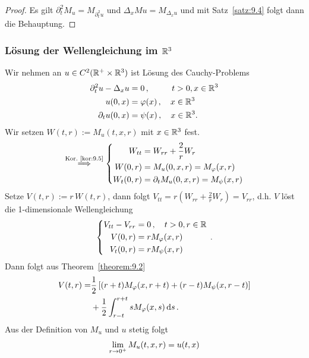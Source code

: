 \begin{proof}
Es gilt $\partial_t^2 M_u = M_{\partial^2_tu}$ und $\Delta_x Mu = M_{\Delta_x u}$ und mit Satz~\ref{satz:9.4} folgt dann die Behauptung.
\end{proof}

\subsubsection{Lösung der Wellengleichung im $\mathbb{R}^3$}

Wir nehmen an $u \in C^2(\mathbb{R}^+ \times \mathbb{R}^3)$ ist Lösung des Cauchy-Problems
\begin{align*}
	\partial^2_t u - \Delta_x u &= 0 \, , \quad \qquad \! \! t >0, x \in \mathbb{R}^3 \\
	u(0,x) & = \varphi (x) \, , \quad x \in \mathbb{R}^3 \\
	\partial_t u(0,x)& = \psi(x) \, , \quad x \in \mathbb{R}^3 .
\end{align*}
Wir setzen $W(t,r) := M_u (t,x,r)$ mit $x \in \mathbb{R}^3$ fest.
\[
	\stackrel{\scriptsize\text{Kor.}~\ref{kor:9.5}}{\Longrightarrow} \left\{
	\begin{aligned}
		W_{tt}&= W_{rr} + \frac 2 r W_r \\
		W(0,r) & = M_u(0,x,r) = M_\varphi (x,r) \\
		W_t (0,r) & = \partial_t M_u (0,x,r) = M_\psi (x,r)
	\end{aligned}
	\right.
\]
Setze $V(t,r) := r \, W(t,r)$, dann folgt $V_{tt} = r(W_{rr} + \frac 2 r W_r) = V_{rr}$, d.h. $V$ löst die 1-dimensionale Wellengleichung
\[
	\left\{
	\begin{aligned}
		V_{tt} - V_{rr} &= 0 \, , \quad t > 0, r \in\mathbb{R} \\
		V(0,r) &= rM_\varphi (x,r) \\
		V_t (0,r) & = r M_\psi (x,r)
	\end{aligned}
	\right. \, .
\]
Dann folgt aus Theorem~\ref{theorem:9.2}
\begin{align}
\label{eq:9.9}
	\begin{aligned}
	V(t,r) =& \frac 12 \left[  (r+t) M_\varphi (x,r+t) + (r-t) M_\psi (x,r-t)  \right]\\
	& + \frac 1 2 \int_{r-t}^{r+t} s M_\varphi (x,s) \,\mathrm{d} s \, .
	\end{aligned}
\end{align}
Aus der Definition von $M_u$ und $u$ stetig folgt
\begin{align}
\label{eq:9.10}
	\lim_{r \rightarrow 0^+} M_u (t,x,r) = u(t,x)
\end{align}
